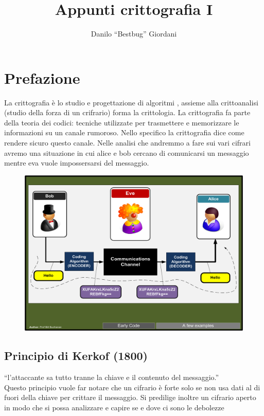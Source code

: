 \documentclass[10pt,a4paper]{article}
\author{Danilo ``Bestbug'' Giordani}
\title{Appunti crittografia I}
\begin{document}
\maketitle
\section{Prefazione}
La crittografia è lo studio e progettazione di algoritmi , assieme alla crittoanalisi (studio della forza di un crifrario) forma la crittologia. La crittografia fa parte della teoria dei codici: tecniche utilizzate per trasmettere e memorizzare le informazioni su un canale rumoroso. Nello specifico la crittografia dice come rendere sicuro questo canale. Nelle analisi che andremmo a fare sui vari cifrari avremo una situazione in cui alice e bob cercano di comunicarsi un messaggio mentre eva vuole impossersarsi del messaggio.

\begin{figure}[htbp]
\includegraphics[scale=0.4]{immagini/eve1.png}
\end{figure}

\subsection{Principio di Kerkof (1800)}
 ``l'attaccante sa tutto tranne la chiave e il contenuto del messaggio.''\\
Questo principio vuole far notare che un cifrario è forte solo se non usa dati al di fuori della chiave per crittare il messaggio. Si predilige inoltre un cifrario aperto in modo che si possa analizzare e capire se e dove ci sono le debolezze
\end{document}
